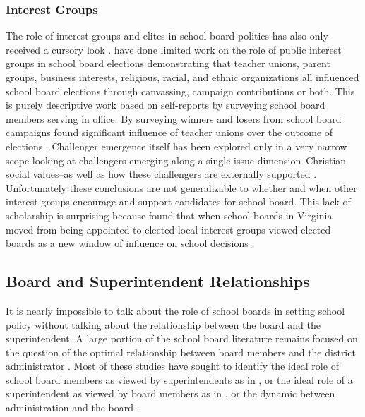\subsubsection{Interest Groups}
The role of interest groups and elites in school board politics has also only received a cursory look \citep{RefWorks:254}. \citet{RefWorks:217} have done limited work on the role of public interest groups in school board elections demonstrating that teacher unions, parent groups, business interests, religious, racial, and ethnic organizations all influenced school board elections through canvassing, campaign contributions or both. This is purely descriptive work based on self-reports by surveying school board members serving in office. By surveying winners and losers from school board campaigns \citet{RefWorks:218} found significant influence of teacher unions over the outcome of elections \citep[see also:][]{RefWorks:320,RefWorks:207}. Challenger emergence itself has been explored only in a very narrow scope looking at challengers emerging along a single issue dimension--Christian social values--as well as how these challengers are externally supported \citep{RefWorks:240,RefWorks:347}. Unfortunately these conclusions are not generalizable to whether and when other interest groups encourage and support candidates for school board. This lack of scholarship is surprising because \citet{RefWorks:242} found that when school boards in Virginia moved from being appointed to elected local interest groups viewed elected boards as a new window of influence on school decisions \citep[see also][]{RefWorks:315}. 



\subsection{Board and Superintendent Relationships}

It is nearly impossible to talk about the role of school boards in setting school policy without talking about the relationship between the board and the superintendent. A large portion of the school board literature remains focused on the question of the optimal relationship between board members and the district administrator \citep[see][]{RefWorks:233,RefWorks:263,RefWorks:227,RefWorks:251,RefWorks:229,RefWorks:234,RefWorks:257,RefWorks:264,RefWorks:226,RefWorks:316}. Most of these studies have sought to identify the ideal role of school board members as viewed by superintendents as in \citet{RefWorks:229,RefWorks:234}, or the ideal role of a superintendent as viewed by board members as in \citet{RefWorks:227, RefWorks:233}, or the dynamic between administration and the board \citet{RefWorks:251, RefWorks:257}. 

